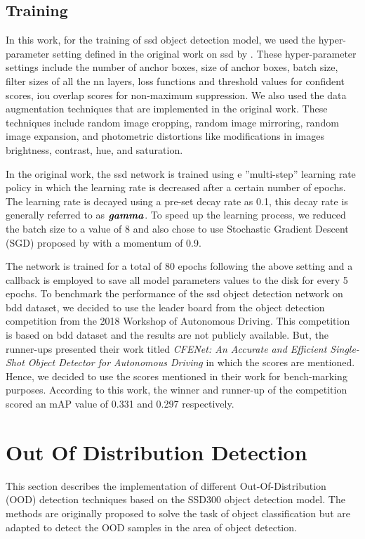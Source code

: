     \subsection{Training}
    \label{ssd_training}
    In this work, for the training of \acrshort{ssd} object detection model, we used the hyper-parameter setting defined in the original work on \acrshort{ssd} by \citet{Liu2016SSDSS}. These hyper-parameter settings include the number of anchor boxes, size of anchor boxes, batch size, filter sizes of all the \acrshort{nn} layers, loss functions and threshold values for confident scores, \acrshort{iou} overlap scores for non-maximum suppression. We also used the data augmentation techniques that are implemented in the original work. These techniques include random image cropping, random image mirroring, random image expansion, and photometric distortions like modifications in images brightness, contrast, hue, and saturation.
    
    In the original work, the \acrshort{ssd} network is trained using e ”multi-step” learning rate policy in which the learning rate is decreased after a certain number of epochs. The learning rate is decayed using a pre-set decay rate as 0.1, this decay rate is generally referred to as $\textbf{\textit{gamma}}$. To speed up the learning process, we reduced the batch size to a value of 8 and also chose to use Stochastic Gradient Descent (SGD) proposed by \citet{ruder2016overview} with a momentum of 0.9. 
    
    The network is trained for a total of 80 epochs following the above setting and a callback is employed to save all model parameters values to the disk for every 5 epochs. To benchmark the performance of the \acrshort{ssd} object detection network on \acrshort{bdd} dataset, we decided to use the leader board from the object detection competition from the 2018 Workshop of Autonomous Driving. This competition is based on \acrshort{bdd} dataset and the results are not publicly available. But, the runner-ups presented their work titled \textit{CFENet: An Accurate and Efficient Single-Shot Object Detector for Autonomous Driving} \cite{Zhao2018} in which the scores are mentioned. Hence, we decided to use the scores mentioned in their work for bench-marking purposes. According to this work, the winner and runner-up of the competition scored an mAP value of 0.331 and 0.297 respectively.
    
    \section{Out Of Distribution Detection }
    This section describes the implementation of different Out-Of-Distribution (OOD) detection techniques based on the SSD300 object detection model. The methods are originally proposed to solve the task of object classification but are adapted to detect the OOD samples in the area of object detection. 
    
